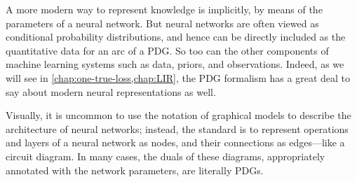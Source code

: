 A more modern way to represent knowledge is implicitly, by means of the parameters of a neural network. 
But neural networks are often viewed as conditional probability distributions, and hence can be directly included as the quantitative data for an arc of a PDG.
So too can the other components of machine learning systems such as data, priors, and observations. 
Indeed, as we will see in \cref{chap:one-true-loss,chap:LIR}, the PDG formalism has a great deal to say about modern neural representations as well.

Visually, it is uncommon to use the notation of graphical models to describe the architecture of neural networks; instead, the standard is to represent operations and layers of a neural network as nodes, and their connections as edges---like a circuit diagram.
In many cases, the duals of these diagrams, appropriately annotated with the network parameters, are literally PDGs.





